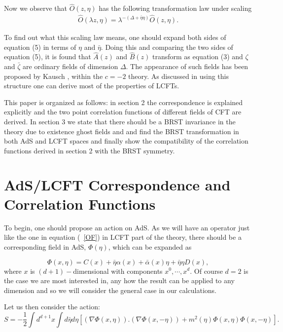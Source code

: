\documentclass[a4paper,11pt]{article}
\begin{document}
Now we observe that $\hat{O} (z,\eta )$ has the following
transformation law under scaling
\begin{eqnarray}  \label{TRLaw}
\hat{O}(\lambda z,\eta)=\lambda^{-(\Delta+\bar{\eta}\eta)}
\hat{O}(z,\eta) .
\end{eqnarray}

To find out what this scaling law means, one should expand both
sides of equation (5) in terms of $\eta$ and $\bar{\eta}$. Doing
this and comparing the two sides of equation (5), it is found that
$\hat{A}(z)$ and $\hat{B}(z)$ transform as equation (3) and
$\zeta$ and $\bar{\zeta}$ are ordinary fields of dimension
$\Delta$. The appearance of such fields has been proposed by
Kausch \cite{Kausch}, within the $c=-2$ theory. As discussed in
\cite{MRS,MRSAlgeb} using this structure one can derive most of
the properties of LCFTs.

This paper is organized as follows: in section 2 the
correspondence is explained explicitly and the two point
correlation functions of different fields of CFT are derived. In
section 3 we state that there should be a BRST invariance in the
theory due to existence ghost fields and and find the BRST
transformation in both AdS and LCFT spaces and finally show the
compatibility of the correlation functions derived in section 2
with the BRST symmetry.

\section{AdS/LCFT Correspondence and Correlation Functions}

 To begin, one should propose an action on AdS. As we will have an
operator just like the one in equation ($\!\!$~\ref{OF}) in LCFT
part of the theory, there should be a corresponding field in AdS,
$\Phi(\eta)$, which can be expanded as

\begin{equation}\label{PHI}
\Phi(x,\eta)=C(x)+\bar{\eta}\alpha(x)+\bar{\alpha}(x)\eta+
\bar{\eta}\eta D(x),
\end{equation}
where $x$ is $(d+1)-$dimensional with components $x^0,\cdots,x^d$.
Of course $d=2$ is the case we are most interested in, any how the
result can be applied to any dimension and so we will consider
the general case in our calculations.

Let us then consider the action:
\begin{equation}
S=-\frac 12\int d^{d+1}x\int d\bar{\eta} d\eta [(\nabla \Phi
(x,\eta )).(\nabla \Phi (x,-\eta ))+ m^2(\eta )\Phi(x,\eta )\Phi
(x,-\eta )]. \label{Action}
\end{equation}
\end{document}
